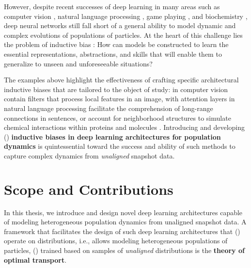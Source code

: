 However, despite recent successes of deep learning in many areas such as computer vision \citep{lecun1998gradient, krizhevsky2012imagenet}, natural language processing \citep{bengio2000neural, vaswani2017attention}, game playing \citep{mnih2015human, silver2016mastering}, and biochemistry \citep{jumper2021highly, kipf2016semi, jin2021iterative}, deep neural networks still fall short of a general ability to model dynamic and complex evolutions of populations of particles.
At the heart of this challenge lies the problem of inductive bias \citep{mitchell1980need}: How can models be constructed to learn the essential representations, abstractions, and skills that will enable them to generalize to unseen and unforeseeable situations?

The examples above highlight the effectiveness of crafting specific architectural inductive biases that are tailored to the object of study:  in computer vision contain filters that process local features in an image,  with attention layers in natural language processing facilitate the comprehension of long-range connections in sentences, or  account for neighborhood structures to simulate chemical interactions within proteins and molecules \citep{ganea2021geomol, somnath2021multi}.
Introducing and developing () \textbf{inductive biases in deep learning architectures for population dynamics}  is quintessential toward the success and ability of such methods to capture complex dynamics from \emph{unaligned} snapshot data.


\section{Scope and Contributions}

In this thesis, we introduce and design novel deep learning architectures capable of modeling heterogeneous population dynamics from unaligned snapshot data.
A framework that facilitates the design of such deep learning architectures that () operate on distributions, i.e., allows modeling heterogeneous populations of particles, () trained based on samples of \emph{unaligned} distributions is the \textbf{theory of optimal transport}.

